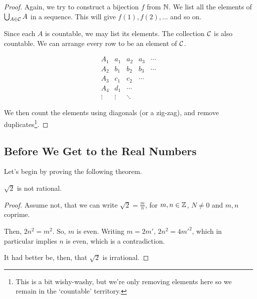 \begin{proof}
    Again, we try to construct a bijection $f$ from $\mathbb N$. We list all the elements of $\bigcup_{A\in\mathcal C}A$ in a sequence. This will give $f(1), f(2), \dots$ and so on.

    Since each $A$ is countable, we may list its elements. The collection $\mathcal C$ is also countable. We can arrange every row to be an element of $\mathcal C$.


    \[\begin{array}{c|cccc}
            A_1    & a_1    & a_2    & a_3    & \cdots \\
            A_2    & b_1    & b_2    & b_3    & \cdots \\
            A_3    & c_1    & c_2    & \cdots          \\
            A_4    & d_1    & \cdots                   \\
            \vdots & \vdots & \ddots
        \end{array}\]

    We then count the elements using diagonals (or a zig-zag), and remove duplicates\footnote{This is a bit wishy-washy, but we're only removing elements here so we remain in the `countable' territory.}.
\end{proof}

\subsection{Before We Get to the Real Numbers}
Let's begin by proving the following theorem.
\begin{theorem}
    $\sqrt{2}$ is not rational.
\end{theorem}
\begin{proof}
    Assume not, that we can write $\sqrt{2} = \frac{m}{n}$, for $m, n\in\mathbb Z$, $N\neq 0$ and $m, n$ coprime.

    Then, $2n^2 = m^2$. So, $m$ is even. Writing $m = 2m'$, $2n^2 = 4m'^2$, which in particular implies $n$ is even, which is a contradiction.

    It had better be, then, that $\sqrt{2}$ is irrational.
\end{proof}

